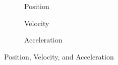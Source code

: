 \documentclass[12pt]{article}
\begin{document}
\begin{figure}[H]
  \centering
  \begin{subfigure}[H]{0.3\textwidth}
    \centering
    
    \caption{Position}
    \label{fig:010}
  \end{subfigure}
  \begin{subfigure}[H]{0.3\textwidth}
    \centering
    
    \caption{Velocity}
    \label{fig:011}
  \end{subfigure}
  \begin{subfigure}[H]{0.3\textwidth}
    \centering
    
    \caption{Acceleration}
    \label{fig:012}
  \end{subfigure}
  \caption{Position, Velocity, and Acceleration}
  \label{fig:posVelAcc}
\end{figure}
\end{document}

